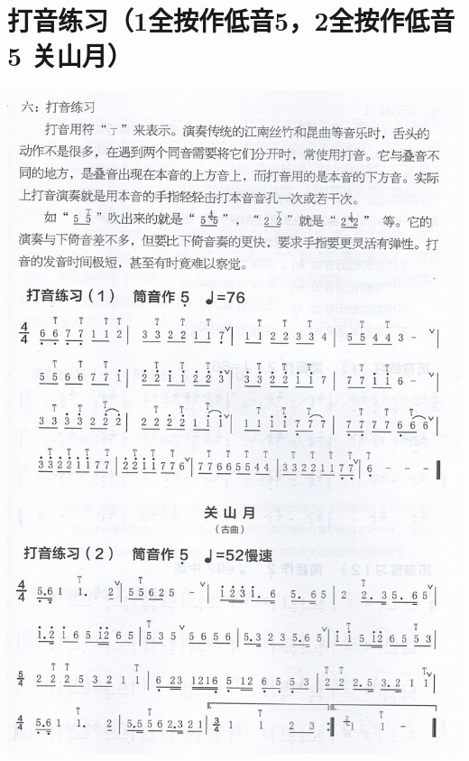 \documentclass[cn,pad,chinese,chinesefont=nofont]{elegantbook}
\begin{document}
\section{打音练习（1全按作低音5，2全按作低音5 关山月）}
\includegraphics[height=\textheight]{dongxiao/Scan 12.jpeg}
\end{document}
